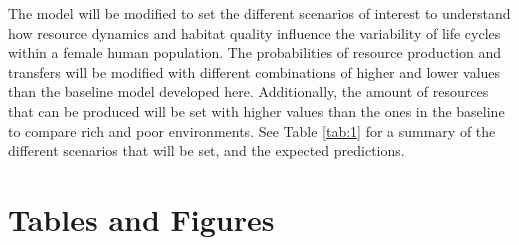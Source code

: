 \documentclass{article}
\begin{document}
The model will be modified to set the different scenarios of interest to understand how resource dynamics and habitat quality influence the variability of life cycles within a female human population. The probabilities of resource production and transfers will be modified with different combinations of higher and lower values than the baseline model developed here. Additionally, the amount of resources that can be produced will be set with higher values than the ones in the baseline to compare rich and poor environments. See Table \ref{tab:1} for a summary of the different scenarios that will be set, and the expected predictions.

\section{Tables and Figures}
\end{document}
